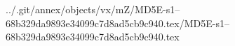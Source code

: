 ../.git/annex/objects/vx/mZ/MD5E-s1--68b329da9893e34099c7d8ad5cb9c940.tex/MD5E-s1--68b329da9893e34099c7d8ad5cb9c940.tex